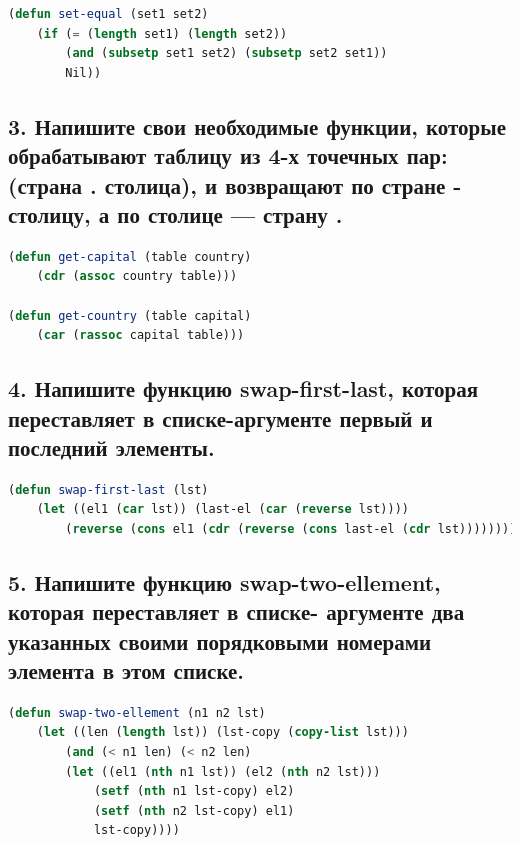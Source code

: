\documentclass[12pt]{report}
\begin{document}
\begin{lstlisting}[label=6xd, caption=Решение задания №2, language=lisp]
(defun set-equal (set1 set2)
	(if (= (length set1) (length set2))
		(and (subsetp set1 set2) (subsetp set2 set1))
		Nil))

\end{lstlisting}

\subsection*{3.  Напишите свои необходимые функции, которые обрабатывают таблицу из 4-х точечных
	пар:
	(страна . столица), и возвращают по стране - столицу, а по столице — страну .}

\begin{lstlisting}[label=6xd, caption=Решение задания №3, language=lisp]
(defun get-capital (table country)
	(cdr (assoc country table)))

(defun get-country (table capital)
	(car (rassoc capital table)))

\end{lstlisting}

\newpage
\subsection*{4.  Напишите функцию swap-first-last, которая переставляет в списке-аргументе первый и
	последний элементы.}

\begin{lstlisting}[label=6xd, caption=Решение задания №4, language=lisp]
(defun swap-first-last (lst)
	(let ((el1 (car lst)) (last-el (car (reverse lst))))
		(reverse (cons el1 (cdr (reverse (cons last-el (cdr lst))))))))

\end{lstlisting}

\subsection*{5. Напишите функцию swap-two-ellement, которая переставляет в списке- аргументе два
	указанных своими порядковыми номерами элемента в этом списке.}

\begin{lstlisting}[label=6xd, caption=Решение задания №5, language=lisp]
(defun swap-two-ellement (n1 n2 lst)
	(let ((len (length lst)) (lst-copy (copy-list lst)))
		(and (< n1 len) (< n2 len)
		(let ((el1 (nth n1 lst)) (el2 (nth n2 lst)))
			(setf (nth n1 lst-copy) el2)
			(setf (nth n2 lst-copy) el1)
			lst-copy))))
	
\end{lstlisting}
\end{document}
